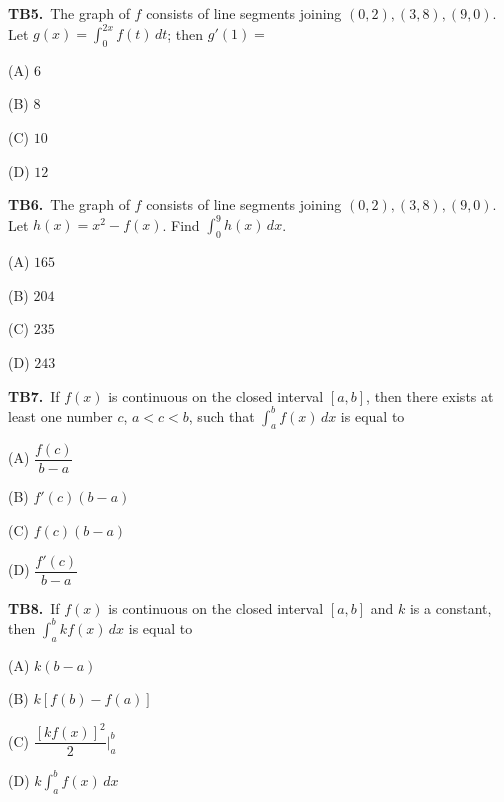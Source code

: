 \documentclass[11pt]{article}
\begin{document}
\bigskip\noindent\textbf{TB5.}\ The graph of $f$ consists of line segments joining $(0,2),(3,8),(9,0)$. Let $g(x) = \displaystyle\int_{0}^{2x} f(t)\,dt$; then $g'(1) =$
\begin{list}{}{\setlength{\leftmargin}{3em}\setlength{\labelwidth}{2.5em}\setlength{\itemsep}{0pt}\setlength{\topsep}{2pt}}
\item[(A)] $6$
\item[(B)] $8$
\item[(C)] $10$
\item[(D)] $12$
\end{list}

\bigskip\noindent\textbf{TB6.}\ The graph of $f$ consists of line segments joining $(0,2),(3,8),(9,0)$. Let $h(x) = x^2 - f(x)$. Find $\displaystyle\int_{0}^{9} h(x)\,dx$.
\begin{list}{}{\setlength{\leftmargin}{3em}\setlength{\labelwidth}{2.5em}\setlength{\itemsep}{0pt}\setlength{\topsep}{2pt}}
\item[(A)] $165$
\item[(B)] $204$
\item[(C)] $235$
\item[(D)] $243$
\end{list}

\bigskip\noindent\textbf{TB7.}\ If $f(x)$ is continuous on the closed interval $[a,b]$, then there exists at least one number $c$, $a<c<b$, such that $\displaystyle\int_{a}^{b} f(x)\,dx$ is equal to
\begin{list}{}{\setlength{\leftmargin}{3em}\setlength{\labelwidth}{2.5em}\setlength{\itemsep}{0pt}\setlength{\topsep}{2pt}}
\item[(A)] $\dfrac{f(c)}{b-a}$
\item[(B)] $f'(c)(b-a)$
\item[(C)] $f(c)(b-a)$
\item[(D)] $\dfrac{f'(c)}{b-a}$
\end{list}

\bigskip\noindent\textbf{TB8.}\ If $f(x)$ is continuous on the closed interval $[a,b]$ and $k$ is a constant, then $\displaystyle\int_{a}^{b} kf(x)\,dx$ is equal to
\begin{list}{}{\setlength{\leftmargin}{3em}\setlength{\labelwidth}{2.5em}\setlength{\itemsep}{0pt}\setlength{\topsep}{2pt}}
\item[(A)] $k(b-a)$
\item[(B)] $k[f(b)-f(a)]$
\item[(C)] $\dfrac{[kf(x)]^2}{2}\Big|_a^b$
\item[(D)] $k\displaystyle\int_{a}^{b} f(x)\,dx$
\end{list}
\end{document}
